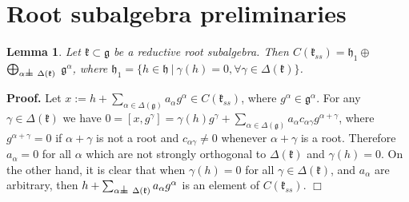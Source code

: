 \documentclass[12pt]{report}
\newtheorem{lemma}[theo]{Lemma}
\newenvironment{proof}[1][]{ \textbf{Proof#1. }}{$\Box$\medskip}
\newcommand{\kk}{\mathfrak{k}}
\newcommand{\hh}{\mathfrak{h}}
\newcommand{\gG}{\mathfrak{g}}
\def\sperp{{\hbox{$\perp${\hbox{\kern -.77em $-$}\raise-1pt\hbox{\kern -.77em $-$}}\ }}}
\begin{document}
\section{Root subalgebra preliminaries}\label{secRootSA}
\begin{lemma}\label{leC(kss)}
Let $\kk\subset\gG$ be a reductive root subalgebra. Then $C(\kk_{ss})= \hh_1\oplus$ $\bigoplus_{ \alpha\sperp\Delta(\kk)}$ $\gG^{\alpha}$, where $\hh_1=\{h\in\hh~|~\gamma(h)=0, \forall \gamma \in \Delta( \kk)\}$. %
\end{lemma}
\begin{proof}
Let $x:=h+\sum_{\alpha\in\Delta(\gG)}a_\alpha g^{\alpha}\in C(\kk_{ss})$, where $g^\alpha\in\gG^\alpha$. For any $\gamma\in\Delta(\kk)$ we have $0=[x,g^\gamma] =\gamma(h)g^\gamma+ \sum_{\alpha\in\Delta(\gG)} a_\alpha c_{\alpha \gamma} g^{\alpha +\gamma}$, where $g^{\alpha +\gamma} =0$ if $\alpha+\gamma$ is not a root and $c_{\alpha\gamma}\neq 0$ whenever $\alpha+\gamma$ is a root. Therefore $a_\alpha=0$ for all $\alpha$ which are not strongly orthogonal to $\Delta(\kk)$ and $\gamma(h)=0$. On the other hand, it is clear that when $\gamma(h)=0$ for all $\gamma\in \Delta(\kk)$, and $a_\alpha$ are arbitrary, then $h+\sum_{\alpha\sperp\Delta(\kk)}a_\alpha g^\alpha$ is an element of $C(\kk_{ss})$.
\end{proof}
\end{document}
